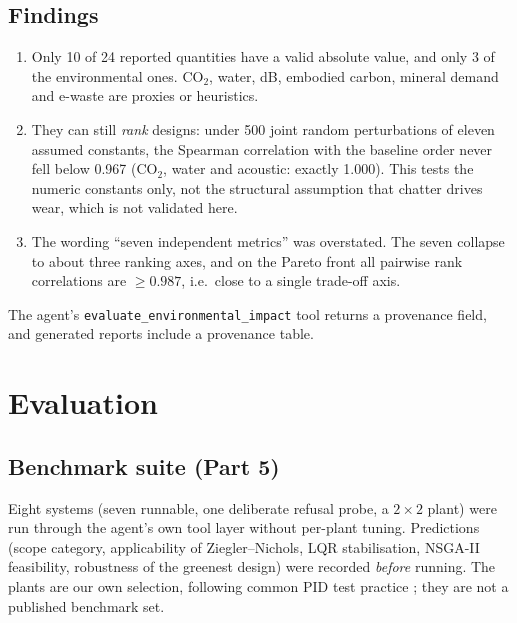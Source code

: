 \documentclass[a4paper,11pt]{article}
\begin{document}
\subsection{Findings}
\begin{enumerate}[nosep]
\item Only 10 of 24 reported quantities have a valid absolute value, and only 3 of the environmental ones. CO$_2$, water, dB, embodied carbon, mineral demand and e-waste are proxies or heuristics.
\item They can still \emph{rank} designs: under 500 joint random perturbations of eleven assumed constants, the Spearman correlation with the baseline order never fell below 0.967 (CO$_2$, water and acoustic: exactly 1.000). This tests the numeric constants only, not the structural assumption that chatter drives wear, which is not validated here.
\item The wording ``seven independent metrics'' was overstated. The seven collapse to about three ranking axes, and on the Pareto front all pairwise rank correlations are $\ge 0.987$, i.e.\ close to a single trade-off axis.
\end{enumerate}
The agent's \texttt{evaluate\_environmental\_impact} tool returns a provenance field, and generated reports include a provenance table.

\section{Evaluation}
\subsection{Benchmark suite (Part 5)}\label{sec:bench}
Eight systems (seven runnable, one deliberate refusal probe, a $2\times2$ plant) were run through the agent's own tool layer without per-plant tuning. Predictions (scope category, applicability of Ziegler--Nichols, LQR stabilisation, NSGA-II feasibility, robustness of the greenest design) were recorded \emph{before} running. The plants are our own selection, following common PID test practice \cite{astromhagglund}; they are not a published benchmark set.
\end{document}
